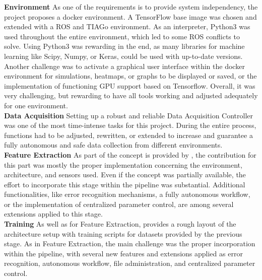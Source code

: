 \textbf{Environment} As one of the requirements is to provide system independency, the project proposes a docker environment. A TensorFlow base image was chosen and extended with a ROS and TIAGo environment. As an interpreter, Python3 was used throughout the entire environment, which led to some ROS conflicts to solve. Using Python3 was rewarding in the end, as many libraries for machine learning like Scipy, Numpy, or Keras, could be used with up-to-date versions. Another challenge was to activate a graphical user interface within the docker environment for simulations, heatmaps, or graphs to be displayed or saved, or the implementation of functioning GPU support based on Tensorflow. Overall, it was very challenging, but rewarding to have all tools working and adjusted adequately for one environment.\\

\textbf{Data Acquisition} Setting up a robust and reliable Data Acquisition Controller was one of the most time-intense tasks for this project. During the entire process, functions had to be adjusted, rewritten, or extended to increase and guarantee a fully autonomous and safe data collection from different environments.\\

\textbf{Feature Extraction} As part of the concept is provided by \cite{nava2019learning}, the contribution for this part was mostly the proper implementation concerning the environment, architecture, and sensors used. Even if the concept was partially available, the effort to incorporate this stage within the pipeline was substantial. Additional functionalities, like error recognition mechanisms, a fully autonomous workflow, or the implementation of centralized parameter control, are among several extensions applied to this stage.\\

\textbf{Training} As well as for Feature Extraction, \cite{nava2019learning} provides a rough layout of the architecture setup with training scripts for datasets provided by the previous stage. As in Feature Extraction, the main challenge was the proper incorporation within the pipeline, with several new features and extensions applied as error recognition, autonomous workflow, file administration, and centralized parameter control.\\

